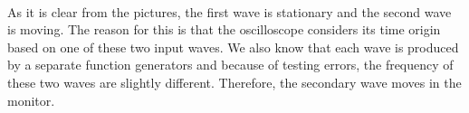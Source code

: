 \documentclass[11pt]{article}
\begin{document}
\begin{question}
{        \paragraph*{}
        As it is clear from the pictures, the first wave is stationary and the second wave is moving. The reason for this is that the oscilloscope considers its time origin based on one of these two input waves. We also know that each wave is produced by a separate function generators and because of testing errors, the frequency of these two waves are slightly different. Therefore, the secondary wave moves in the monitor.

    }

\end{question}

\end{document}
